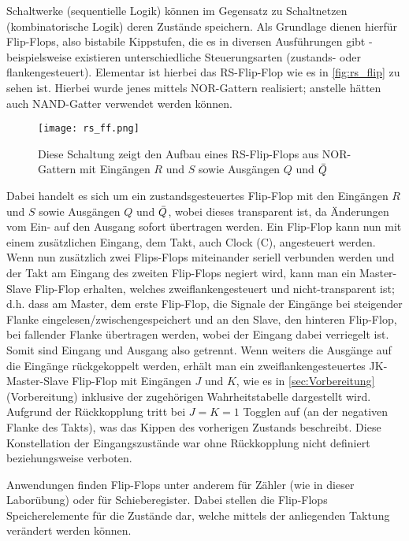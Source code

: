 Schaltwerke (sequentielle Logik) können im Gegensatz zu 
Schaltnetzen (kombinatorische Logik) deren Zustände
speichern. Als Grundlage dienen hierfür Flip-Flops,
also bistabile Kippstufen, die es in diversen
Ausführungen gibt - beispielsweise existieren unterschiedliche
Steuerungsarten (zustands- oder flankengesteuert). 
Elementar ist hierbei das RS-Flip-Flop wie es in
\autoref{fig:rs_flip} zu sehen ist. Hierbei wurde jenes
mittels NOR-Gattern realisiert; anstelle hätten auch
NAND-Gatter verwendet werden können.
\begin{figure}[H]
  \centering
    \texttt{[image: rs\_ff.png]}
    \caption{Diese Schaltung zeigt den Aufbau eines
    RS-Flip-Flops aus NOR-Gattern mit Eingängen $R$ und
    $S$ sowie Ausgängen $Q$ und $\Bar{Q}$ \cite{tietze}
  }
  \label{fig:rs_flip}
\end{figure}
Dabei handelt es sich um ein zustandsgesteuertes
Flip-Flop mit den Eingängen $R$ und $S$ sowie
Ausgängen $Q$ und $\Bar{Q}$, wobei dieses
transparent ist, da Änderungen vom Ein- auf den
Ausgang sofort übertragen werden.
Ein Flip-Flop kann nun mit einem zusätzlichen
Eingang, dem Takt, auch Clock (C),
angesteuert werden. Wenn nun zusätzlich zwei Flips-Flops miteinander
seriell verbunden werden und der Takt am Eingang des zweiten Flip-Flops 
negiert wird, kann man ein Master-Slave Flip-Flop erhalten, welches
zweiflankengesteuert und nicht-transparent ist; d.h. dass am Master, dem erste Flip-Flop, die
Signale der Eingänge bei steigender Flanke eingelesen/zwischengespeichert
und an den Slave, den hinteren Flip-Flop, bei fallender Flanke
übertragen werden, wobei der Eingang dabei verriegelt ist.
Somit sind Eingang und Ausgang also getrennt.
Wenn weiters die Ausgänge auf die Eingänge rückgekoppelt
werden, erhält man ein zweiflankengesteuertes JK-Master-Slave
Flip-Flop mit Eingängen $J$ und $K$, wie es in \autoref{sec:Vorbereitung} 
(Vorbereitung) inklusive
der zugehörigen Wahrheitstabelle dargestellt wird. Aufgrund
der Rückkopplung tritt bei $J=K=1$  Togglen auf (an der negativen Flanke des Takts),
was das Kippen des vorherigen Zustands beschreibt. Diese Konstellation der
Eingangszustände war ohne Rückkopplung nicht definiert beziehungsweise verboten.

Anwendungen finden Flip-Flops unter anderem für Zähler (wie in dieser
Laborübung) oder für Schieberegister. Dabei stellen die Flip-Flops
Speicherelemente für die Zustände dar, welche mittels der
anliegenden Taktung
verändert werden können. 